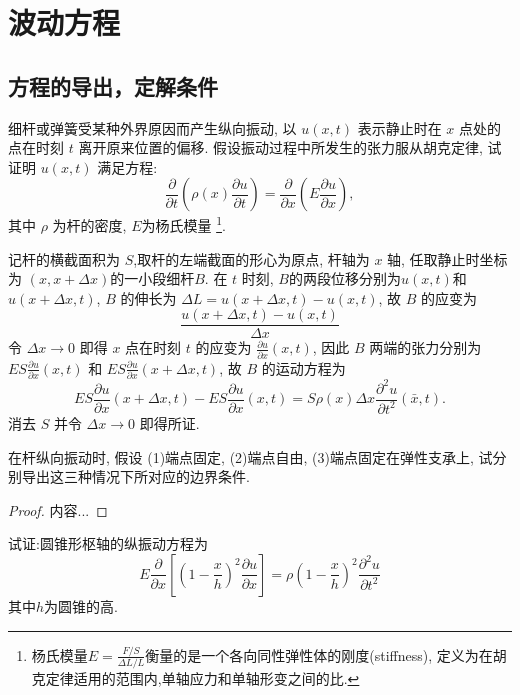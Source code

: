 
\chapter{波动方程}

\section{方程的导出，定解条件}


\begin{exercise}
  细杆或弹簧受某种外界原因而产生纵向振动, 
  以 $u(x,t)$ 表示静止时在 $x$ 点处的点在时刻 $t$ 离开原来位置的偏移.
  假设振动过程中所发生的张力服从胡克定律, 试证明 $u(x,t)$ 满足方程:
  \[\frac{\partial}{\partial t}\left(\rho(x)\frac{\partial u}{\partial t}\right)
    = \frac{\partial}{\partial x}\left(E\frac{\partial u}{\partial x}\right),\]
  其中 $\rho$ 为杆的密度, $E$为杨氏模量%
  \footnote{杨氏模量$E=\frac{F/S}{\Delta L/L}$衡量的是一个各向同性弹性体的刚度(stiffness),
    定义为在胡克定律适用的范围内,单轴应力和单轴形变之间的比.}.
\end{exercise}


  记杆的横截面积为 $S$,取杆的左端截面的形心为原点, 杆轴为 $x$ 轴,
  任取静止时坐标为 $(x,x+\Delta x)$的一小段细杆$B$.
  在 $t$ 时刻, $B$的两段位移分别为$u(x,t)$和$u(x+\Delta x,t)$,
  $B$ 的伸长为 $\Delta L=u(x+\Delta x,t)-u(x,t)$, 故 $B$ 的应变为
  \[\frac{u(x+\Delta x,t)-u(x,t)}{\Delta x}\]
  令 $\Delta x\to 0$ 即得 $x$ 点在时刻 $t$ 的应变为 $\frac{\partial u}{\partial x}(x,t)$,
  因此 $B$ 两端的张力分别为 $ES\frac{\partial u}{\partial x}(x,t)$
  和 $ES\frac{\partial u}{\partial x}(x+\Delta x,t)$, 故 $B$ 的运动方程为
  \[ES\frac{\partial u}{\partial x}(x+\Delta x,t)-ES\frac{\partial u}{\partial x}(x,t)
    = S\rho(x)\Delta x\frac{\partial^2u}{\partial t^2}(\bar{x},t).\]
  消去 $S$ 并令 $\Delta x\to 0$ 即得所证.



\begin{exercise}
  在杆纵向振动时, 假设 (1)端点固定, (2)端点自由, (3)端点固定在弹性支承上,
  试分别导出这三种情况下所对应的边界条件.
\end{exercise}

\begin{proof}
	内容...
\end{proof}


\begin{exercise}
  试证:圆锥形枢轴的纵振动方程为
  \[E\frac{\partial}{\partial x}\left[\left(1-\frac{x}{h}\right)^2\frac{\partial u}{\partial x}\right]=\rho\left(1-\frac{x}{h}\right)^2\frac{\partial^2u}{\partial t^2}\]
  其中$h$为圆锥的高.
\end{exercise}

